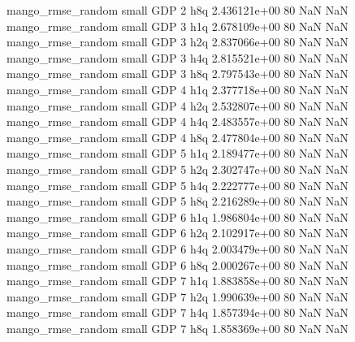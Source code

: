 mango_rmse_random      small      GDP                 2                  h8q 2.436121e+00 80            NaN                NaN
mango_rmse_random      small      GDP                 3                  h1q 2.678109e+00 80            NaN                NaN
mango_rmse_random      small      GDP                 3                  h2q 2.837066e+00 80            NaN                NaN
mango_rmse_random      small      GDP                 3                  h4q 2.815521e+00 80            NaN                NaN
mango_rmse_random      small      GDP                 3                  h8q 2.797543e+00 80            NaN                NaN
mango_rmse_random      small      GDP                 4                  h1q 2.377718e+00 80            NaN                NaN
mango_rmse_random      small      GDP                 4                  h2q 2.532807e+00 80            NaN                NaN
mango_rmse_random      small      GDP                 4                  h4q 2.483557e+00 80            NaN                NaN
mango_rmse_random      small      GDP                 4                  h8q 2.477804e+00 80            NaN                NaN
mango_rmse_random      small      GDP                 5                  h1q 2.189477e+00 80            NaN                NaN
mango_rmse_random      small      GDP                 5                  h2q 2.302747e+00 80            NaN                NaN
mango_rmse_random      small      GDP                 5                  h4q 2.222777e+00 80            NaN                NaN
mango_rmse_random      small      GDP                 5                  h8q 2.216289e+00 80            NaN                NaN
mango_rmse_random      small      GDP                 6                  h1q 1.986804e+00 80            NaN                NaN
mango_rmse_random      small      GDP                 6                  h2q 2.102917e+00 80            NaN                NaN
mango_rmse_random      small      GDP                 6                  h4q 2.003479e+00 80            NaN                NaN
mango_rmse_random      small      GDP                 6                  h8q 2.000267e+00 80            NaN                NaN
mango_rmse_random      small      GDP                 7                  h1q 1.883858e+00 80            NaN                NaN
mango_rmse_random      small      GDP                 7                  h2q 1.990639e+00 80            NaN                NaN
mango_rmse_random      small      GDP                 7                  h4q 1.857394e+00 80            NaN                NaN
mango_rmse_random      small      GDP                 7                  h8q 1.858369e+00 80            NaN                NaN
